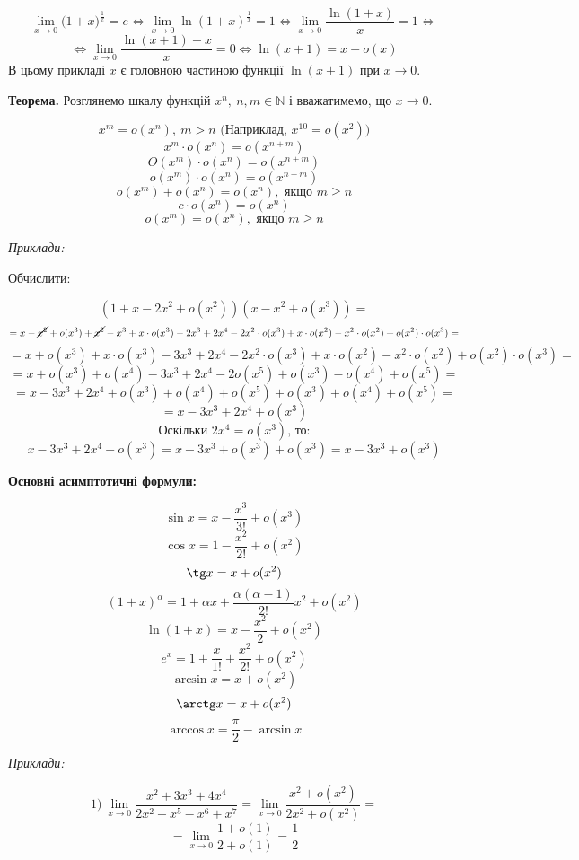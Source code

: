 \documentclass[12pt]{report}
\begin{document}
$$\lim_{x\to 0 }\Big( 1 + x \Big)^{\frac{1}{x}} = e \Longleftrightarrow \lim_{x\to 0} \ln (1 + x)^{\frac{1}{x}} = 1 \Longleftrightarrow \lim_{x\to 0} \frac{\ln (1+x)}{x} = 1 \Longleftrightarrow $$ 
$$\Longleftrightarrow \lim_{x \to 0} \frac{\ln(x+1) - x}{x} = 0 \Longleftrightarrow \ln(x+1) = x + o(x)$$
В цьому прикладі $x$ є головною частиною функції $\ln(x+1)$ при $x \to 0$.

\vspace{5mm}

\textbf{Теорема.} Розглянемо шкалу функцій $x^n, \ n, m \in \mathbb{N}$ і вважатимемо, що $x \to 0$.

$$x^m = o(x^n), \ m > n \textrm{ (Наприклад, $x^{10} = o(x^2)$)}$$
$$x^m \cdot o(x^n) = o(x^{n+m})$$
$$O(x^m)\cdot o(x^n) = o(x^{n+m})$$
$$o(x^m)\cdot o(x^n) = o(x^{n+m})$$
$$o(x^m) + o(x^n) = o(x^n), \textrm{ якщо $m \geq n$}$$
$$c\cdot o(x^n) = o(x^n)$$
$$o(x^m) = o(x^n), \textrm{ якщо $m \geq n$}$$

\textit{Приклади:}

\vspace{3mm}

Обчислити:

$$(1 + x - 2x^2 + o(x^2))(x - x^2 + o(x^3)) = $$
$$=x - \cancel{x^2} + o(x^3) + \cancel{x^2} - x^3 + x \cdot o(x^3) - 2x^3 + 2x^4 - 2x^2\cdot o(x^3) + x\cdot o(x^2) - x^2 \cdot o(x^2) + o(x^2) \cdot o(x^3) = $$
$$=x + o(x^3) + x \cdot o(x^3) - 3x^3 + 2x^4 - 2x^2\cdot o(x^3) + x\cdot o(x^2) - x^2 \cdot o(x^2) + o(x^2) \cdot o(x^3) = $$
$$=x + o(x^3) + o(x^4) - 3x^3 + 2x^4 - 2o(x^5) + o(x^3) - o(x^4) + o(x^5) = $$
$$=x - 3x^3 + 2x^4 + o(x^3) + o(x^4) + o(x^5) + o(x^3) + o(x^4) + o(x^5) = $$
$$=x - 3x^3 + 2x^4 + o(x^3)$$
$$\textrm{Оскільки $2x^4 = o(x^3)$, то:}$$
$$x - 3x^3 + 2x^4 + o(x^3) = x - 3x^3 + o(x^3) + o(x^3) = x - 3x^3 + o(x^3)$$

\textbf{Основні асимптотичні формули:}

$$\sin x = x - \frac{x^3}{3!} + o(x^3)$$
$$\cos x = 1 - \frac{x^2}{2!} + o(x^2)$$
$$\tg x = x + o(x^2)$$
$$(1+x)^{\alpha} = 1 + \alpha x + \frac{\alpha (\alpha - 1)}{2!}x^2 + o(x^2)$$
$$\ln (1 + x) = x - \frac{x^2}{2} + o(x^2)$$
$$e^x = 1 + \frac{x}{1!} + \frac{x^2}{2!} + o(x^2)$$
$$\arcsin x = x + o(x^2)$$
$$\arctg x = x + o(x^2)$$
$$\arccos x = \frac{\pi}{2} - \arcsin x$$

\textit{Приклади:}

$$1)\ \lim_{x\to 0} \frac{x^2 + 3x^3  +4x^4}{2x^2 + x^5 - x^6 + x^7} = \lim_{x\to 0} \frac{x^2 + o(x^2)}{2x^2 + o(x^2)} = $$
$$ = \lim_{x\to 0} \frac{1 + o(1)}{2 + o(1)} = \frac{1}{2}$$
\end{document}
